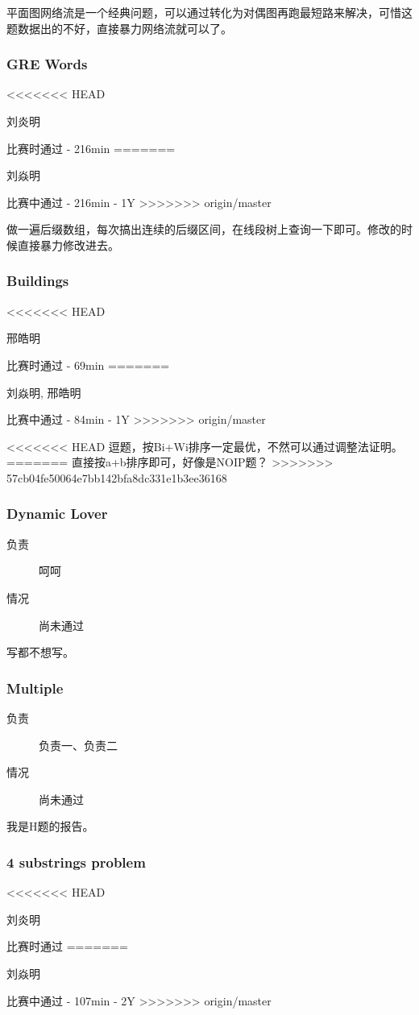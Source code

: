 \documentclass[a4paper, 11pt, nofonts, nocap, fancyhdr]{ctexart}
\newcommand{\problem}[1]{\subsubsection{#1}}
\begin{document}
平面图网络流是一个经典问题，可以通过转化为对偶图再跑最短路来解决，可惜这题数据出的不好，直接暴力网络流就可以了。

\problem{GRE Words}

\begin{description}
<<<<<<< HEAD
\item[负责] 刘炎明
\item[情况] 比赛时通过 - 216min
=======
\item[负责] 刘焱明
\item[情况] 比赛中通过 - 216min - 1Y
>>>>>>> origin/master
\end{description}

做一遍后缀数组，每次搞出连续的后缀区间，在线段树上查询一下即可。修改的时候直接暴力修改进去。

\problem{Buildings}

\begin{description}
<<<<<<< HEAD
\item[负责] 邢皓明
\item[情况] 比赛时通过 - 69min
=======
\item[负责] 刘焱明, 邢皓明
\item[情况] 比赛中通过 - 84min - 1Y
>>>>>>> origin/master
\end{description}

<<<<<<< HEAD
逗题，按Bi+Wi排序一定最优，不然可以通过调整法证明。
=======
直接按a+b排序即可，好像是NOIP题？
>>>>>>> 57cb04fe50064e7bb142bfa8dc331e1b3ee36168

\problem{Dynamic Lover}

\begin{description}
\item[负责] 呵呵
\item[情况] 尚未通过
\end{description}

写都不想写。


\problem{Multiple}

\begin{description}
\item[负责] 负责一、负责二
\item[情况] 尚未通过
\end{description}

我是H题的报告。

\problem{4 substrings problem}

\begin{description}
<<<<<<< HEAD
\item[负责] 刘炎明
\item[情况] 比赛时通过
=======
\item[负责] 刘焱明
\item[情况] 比赛中通过 - 107min - 2Y
>>>>>>> origin/master
\end{description}
\end{document}
